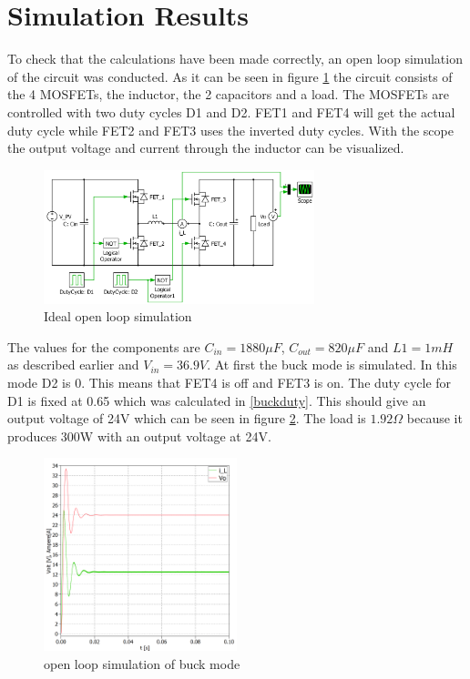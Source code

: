 \section{Simulation Results}

To check that the calculations have been made correctly, an open loop simulation of the circuit was conducted. As it can be seen in figure \ref{fig:openloop_schematic} the circuit consists of the 4 MOSFETs, the inductor, the 2 capacitors and a load. The MOSFETs are controlled with two duty cycles D1 and D2. FET1 and FET4 will get the actual duty cycle while FET2 and FET3 uses the inverted duty cycles. With the scope the output voltage and current through the inductor can be visualized.

\begin{figure}[H]
	\begin{center}
		\includegraphics[width=0.7\textwidth]{../Pictures/P1/Open_loop_simulation/open_loop_schematic}
		\caption{Ideal open loop simulation}
		\label{fig:openloop_schematic}
	\end{center}
\end{figure}
The values for the components are $C_{in}=1880\mu F$, $C_{out}=820\mu F$ and $L1=1mH$ as described earlier and $V_{in}=36.9V$. At first the buck mode is simulated. In this mode D2 is 0. This means that FET4 is off and FET3 is on. The duty cycle for D1 is fixed at 0.65 which was calculated in \ref{buckduty}. This should give an output voltage of 24V which can be seen in figure \ref{bucksimulation}. The load is $1.92\Omega$ because it produces 300W with an output voltage at 24V.     
\begin{figure}[H]
 	\begin{center}
 		\includegraphics[width=0.5\textwidth]{../Pictures/P1/Open_loop_simulation/open_loop_buck}
 		\caption{open loop simulation of buck mode}
 		\label{bucksimulation}
 	\end{center}
\end{figure} 
